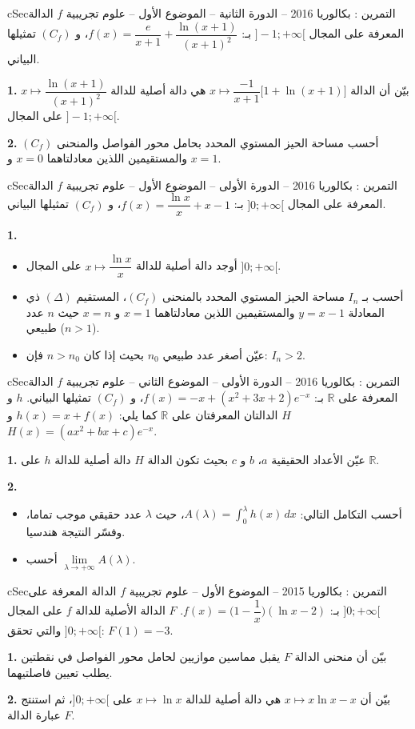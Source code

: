 \documentclass[12pt,a4paper]{article}
\newenvironment{BOX}[2]{\begin{otherlanguage}{english}\begin{arbox}{#1}{#2}}{\end{arbox}\end{otherlanguage}}
\newcounter{exo}
\newenvironment{tamrin}[1]{\stepcounter{exo}\begin{BOX}{cSec}{التمرين \theexo: #1}}{\end{BOX}}
\newcommand{\R}{\mathbb{R}}
\newenvironment{sq}{\begin{itemize}[leftmargin=2.4em,itemsep=3pt]}{\end{itemize}}
\newcommand{\qa}{\item[(أ)]}\newcommand{\qb}{\item[(ب)]}\newcommand{\qc}{\item[(جـ)]}\newcommand{\qd}{\item[(د)]}\newcommand{\qe}{\item[(هـ)]}
\newcommand{\QQ}[1]{\par\smallskip\textbf{#1.} }
\begin{document}
\begin{tamrin}{بكالوريا 2016 -- الدورة الثانية -- الموضوع الأول -- علوم تجريبية}
$f$ الدالة المعرفة على المجال $]-1;+\infty[$ بـ: $f(x)=\dfrac{e}{x+1}+\dfrac{\ln(x+1)}{(x+1)^2}$، و $(C_f)$ تمثيلها البياني.
\QQ{1} بيّن أن الدالة $x\mapsto\dfrac{-1}{x+1}\big[1+\ln(x+1)\big]$ هي دالة أصلية للدالة $x\mapsto\dfrac{\ln(x+1)}{(x+1)^2}$ على المجال $]-1;+\infty[$.
\QQ{2} أحسب مساحة الحيز المستوي المحدد بحامل محور الفواصل والمنحنى $(C_f)$ والمستقيمين اللذين معادلتاهما $x=0$ و $x=1$.
\end{tamrin}

\begin{tamrin}{بكالوريا 2016 -- الدورة الأولى -- الموضوع الأول -- علوم تجريبية}
$f$ الدالة المعرفة على المجال $]0;+\infty[$ بـ: $f(x)=\dfrac{\ln x}{x}+x-1$، و $(C_f)$ تمثيلها البياني.
\QQ{1}
\begin{sq}
\qa أوجد دالة أصلية للدالة $x\mapsto\dfrac{\ln x}{x}$ على المجال $]0;+\infty[$.
\qb أحسب بـ $I_n$ مساحة الحيز المستوي المحدد بالمنحنى $(C_f)$، المستقيم $(\Delta)$ ذي المعادلة $y=x-1$ والمستقيمين اللذين معادلتاهما $x=1$ و $x=n$ حيث $n$ عدد طبيعي ($n>1$).
\qc عيّن أصغر عدد طبيعي $n_0$ بحيث إذا كان $n>n_0$ فإن: $I_n>2$.
\end{sq}
\end{tamrin}

\begin{tamrin}{بكالوريا 2016 -- الدورة الأولى -- الموضوع الثاني -- علوم تجريبية}
$f$ الدالة المعرفة على $\R$ بـ: $f(x)=-x+(x^2+3x+2)e^{-x}$، و $(C_f)$ تمثيلها البياني.
$h$ و $H$ الدالتان المعرفتان على $\R$ كما يلي: $h(x)=x+f(x)$ و $H(x)=(ax^2+bx+c)e^{-x}$.
\QQ{1} عيّن الأعداد الحقيقية $a$، $b$ و $c$ بحيث تكون الدالة $H$ دالة أصلية للدالة $h$ على $\R$.
\QQ{2}
\begin{sq}
\qa أحسب التكامل التالي: $A(\lambda)=\displaystyle\int_0^\lambda h(x)\,dx$، حيث $\lambda$ عدد حقيقي موجب تماما، وفسّر النتيجة هندسيا.
\qb أحسب $\lim\limits_{\lambda\to+\infty}A(\lambda)$.
\end{sq}
\end{tamrin}

\begin{tamrin}{بكالوريا 2015 -- الموضوع الأول -- علوم تجريبية}
$f$ الدالة المعرفة على $]0;+\infty[$ بـ: $f(x)=\Big(1-\dfrac1x\Big)(\ln x-2)$.
$F$ الدالة الأصلية للدالة $f$ على المجال $]0;+\infty[$ والتي تحقق: $F(1)=-3$.
\QQ{1} بيّن أن منحنى الدالة $F$ يقبل مماسين موازيين لحامل محور الفواصل في نقطتين يطلب تعيين فاصلتيهما.
\QQ{2} بيّن أن $x\mapsto x\ln x-x$ هي دالة أصلية للدالة $x\mapsto\ln x$ على $]0;+\infty[$، ثم استنتج عبارة الدالة $F$.
\end{tamrin}
\end{document}
